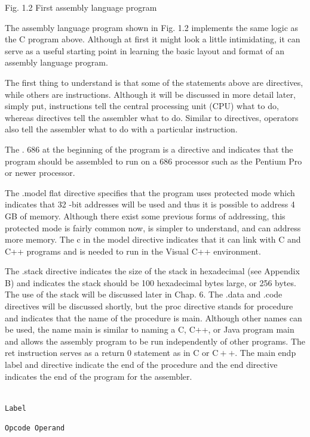 \documentclass[10pt]{book}
\begin{document}
Fig. 1.2 First assembly language program

The assembly language program shown in Fig. 1.2 implements the same logic as the C program above. Although at first it might look a little intimidating, it can serve as a useful starting point in learning the basic layout and format of an assembly language program.

The first thing to understand is that some of the statements above are directives, while others are instructions. Although it will be discussed in more detail later, simply put, instructions tell the central processing unit (CPU) what to do, whereas directives tell the assembler what to do. Similar to directives, operators also tell the assembler what to do with a particular instruction.

The . 686 at the beginning of the program is a directive and indicates that the program should be assembled to run on a 686 processor such as the Pentium Pro or newer processor.

The .model flat directive specifies that the program uses protected mode which indicates that 32 -bit addresses will be used and thus it is possible to address 4 GB of memory. Although there exist some previous forms of addressing, this protected mode is fairly common now, is simpler to understand, and can address more memory. The c in the model directive indicates that it can link with C and C++ programs and is needed to run in the Visual C++ environment.

The .stack directive indicates the size of the stack in hexadecimal (see Appendix B) and indicates the stack should be 100 hexadecimal bytes large, or 256 bytes. The use of the stack will be discussed later in Chap. 6. The .data and .code directives will be discussed shortly, but the proc directive stands for procedure and indicates that the name of the procedure is main. Although other names can be used, the name main is similar to naming a C, C++, or Java program main and allows the assembly program to be run independently of other programs. The ret instruction serves as a return 0 statement as in C or $\mathrm{C}++$. The main endp label and directive indicate the end of the procedure and the end directive indicates the end of the program for the assembler.

\begin{verbatim}

Label
\end{verbatim}

\begin{verbatim}
Opcode Operand
\end{verbatim}
\end{document}
